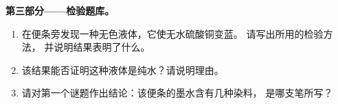 \begin{problem}
\medskip
\noindent\textbf{第三部分——检验题库。}
\begin{enumerate}[resume]
  \item 在便条旁发现一种无色液体，它使无水硫酸铜变蓝。
        请写出所用的检验方法，
        并说明结果表明了什么。
  \item 该结果能否证明这种液体是纯水？请说明理由。
  \item 请对第一个谜题作出结论：该便条的墨水含有几种染料，
        是哪支笔所写？
\end{enumerate}
\end{problem}

